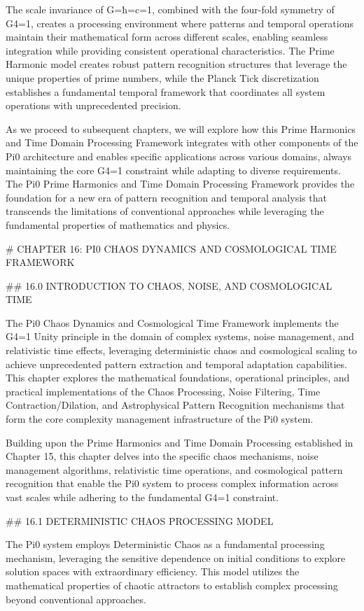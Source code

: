 The scale invariance of G=ħ=c=1, combined with the four-fold symmetry of G4=1, creates a processing environment where patterns and temporal operations maintain their mathematical form across different scales, enabling seamless integration while providing consistent operational characteristics. The Prime Harmonic model creates robust pattern recognition structures that leverage the unique properties of prime numbers, while the Planck Tick discretization establishes a fundamental temporal framework that coordinates all system operations with unprecedented precision.

As we proceed to subsequent chapters, we will explore how this Prime Harmonics and Time Domain Processing Framework integrates with other components of the Pi0 architecture and enables specific applications across various domains, always maintaining the core G4=1 constraint while adapting to diverse requirements. The Pi0 Prime Harmonics and Time Domain Processing Framework provides the foundation for a new era of pattern recognition and temporal analysis that transcends the limitations of conventional approaches while leveraging the fundamental properties of mathematics and physics.

# CHAPTER 16: PI0 CHAOS DYNAMICS AND COSMOLOGICAL TIME FRAMEWORK

## 16.0 INTRODUCTION TO CHAOS, NOISE, AND COSMOLOGICAL TIME

The Pi0 Chaos Dynamics and Cosmological Time Framework implements the G4=1 Unity principle in the domain of complex systems, noise management, and relativistic time effects, leveraging deterministic chaos and cosmological scaling to achieve unprecedented pattern extraction and temporal adaptation capabilities. This chapter explores the mathematical foundations, operational principles, and practical implementations of the Chaos Processing, Noise Filtering, Time Contraction/Dilation, and Astrophysical Pattern Recognition mechanisms that form the core complexity management infrastructure of the Pi0 system.

Building upon the Prime Harmonics and Time Domain Processing established in Chapter 15, this chapter delves into the specific chaos mechanisms, noise management algorithms, relativistic time operations, and cosmological pattern recognition that enable the Pi0 system to process complex information across vast scales while adhering to the fundamental G4=1 constraint.

## 16.1 DETERMINISTIC CHAOS PROCESSING MODEL

The Pi0 system employs Deterministic Chaos as a fundamental processing mechanism, leveraging the sensitive dependence on initial conditions to explore solution spaces with extraordinary efficiency. This model utilizes the mathematical properties of chaotic attractors to establish complex processing beyond conventional approaches.

